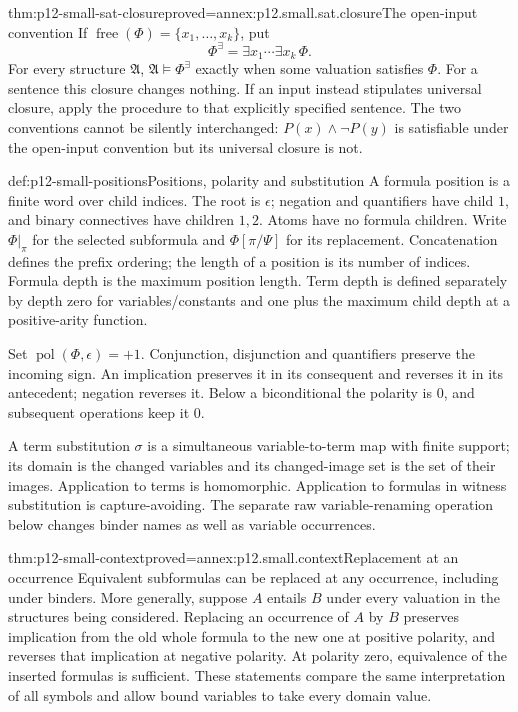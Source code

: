 \begin{hbtheorem}{thm:p12-small-sat-closure}{proved=annex:p12.small.sat.closure}{The open-input convention}
If \(\operatorname{free}(\Phi)=\{x_1,\ldots,x_k\}\), put
\[
                   \Phi^\exists=\exists x_1\cdots\exists x_k\,\Phi .
\]
For every structure \(\mathfrak A\),
\(\mathfrak A\models\Phi^\exists\) exactly when some valuation
satisfies \(\Phi\). For a sentence this closure changes nothing.
If an input instead stipulates universal closure, apply the procedure
to that explicitly specified sentence. The two conventions cannot
be silently interchanged: \(P(x)\land\neg P(y)\) is satisfiable
under the open-input convention but its universal closure is not.
\end{hbtheorem}

\begin{hbdefinition}{def:p12-small-positions}{Positions, polarity and substitution}
A formula position is a finite word over child indices. The root
is \(\epsilon\); negation and quantifiers have child \(1\), and
binary connectives have children \(1,2\). Atoms have no formula
children. Write \(\Phi|_\pi\) for the selected subformula and
\(\Phi[\pi/\Psi]\) for its replacement. Concatenation defines
the prefix ordering; the length of a position is its number of indices.
Formula depth is the maximum position length. Term depth is defined
separately by depth zero for variables/constants and one plus the
maximum child depth at a positive-arity function.

Set \(\operatorname{pol}(\Phi,\epsilon)=+1\).
Conjunction, disjunction and quantifiers preserve the incoming sign.
An implication preserves it in its consequent and reverses it in
its antecedent; negation reverses it. Below a biconditional the
polarity is \(0\), and subsequent operations keep it \(0\).

A term substitution \(\sigma\) is a simultaneous variable-to-term
map with finite support; its domain is the changed variables and
its changed-image set is the set of their images. Application to
terms is homomorphic. Application to formulas in witness substitution
is capture-avoiding. The separate raw variable-renaming operation
below changes binder names as well as variable occurrences.
\end{hbdefinition}

\begin{hblemma}{thm:p12-small-context}{proved=annex:p12.small.context}{Replacement at an occurrence}
Equivalent subformulas can be replaced at any occurrence, including
under binders. More generally, suppose \(A\) entails \(B\) under
every valuation in the structures being considered. Replacing
an occurrence of \(A\) by \(B\) preserves implication from the old
whole formula to the new one at positive polarity, and reverses
that implication at negative polarity. At polarity zero,
equivalence of the inserted formulas is sufficient.
These statements compare the same interpretation of all symbols
and allow bound variables to take every domain value.
\end{hblemma}


